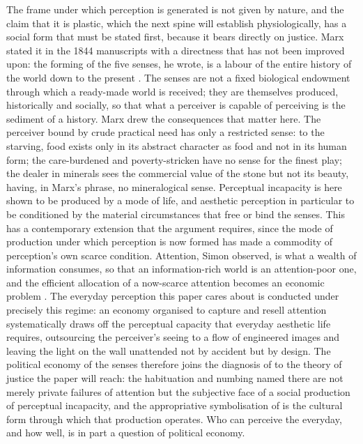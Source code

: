 The frame under which perception is generated is not given by nature, and the claim that it is plastic, which the next spine will establish physiologically, has a social form that must be stated first, because it bears directly on justice. Marx stated it in the 1844 manuscripts with a directness that has not been improved upon: the forming of the five senses, he wrote, is a labour of the entire history of the world down to the present \parencite{marx1844}. The senses are not a fixed biological endowment through which a ready-made world is received; they are themselves produced, historically and socially, so that what a perceiver is capable of perceiving is the sediment of a history. Marx drew the consequences that matter here. The perceiver bound by crude practical need has only a restricted sense: to the starving, food exists only in its abstract character as food and not in its human form; the care-burdened and poverty-stricken have no sense for the finest play; the dealer in minerals sees the commercial value of the stone but not its beauty, having, in Marx's phrase, no mineralogical sense. Perceptual incapacity is here shown to be produced by a mode of life, and aesthetic perception in particular to be conditioned by the material circumstances that free or bind the senses. This has a contemporary extension that the argument requires, since the mode of production under which perception is now formed has made a commodity of perception's own scarce condition. Attention, Simon observed, is what a wealth of information consumes, so that an information-rich world is an attention-poor one, and the efficient allocation of a now-scarce attention becomes an economic problem \parencite{simon1971}. The everyday perception this paper cares about is conducted under precisely this regime: an economy organised to capture and resell attention systematically draws off the perceptual capacity that everyday aesthetic life requires, outsourcing the perceiver's seeing to a flow of engineered images and leaving the light on the wall unattended not by accident but by design. The political economy of the senses therefore joins the diagnosis of  to the theory of justice the paper will reach: the habituation and numbing named there are not merely private failures of attention but the subjective face of a social production of perceptual incapacity, and the appropriative symbolisation of  is the cultural form through which that production operates. Who can perceive the everyday, and how well, is in part a question of political economy.

